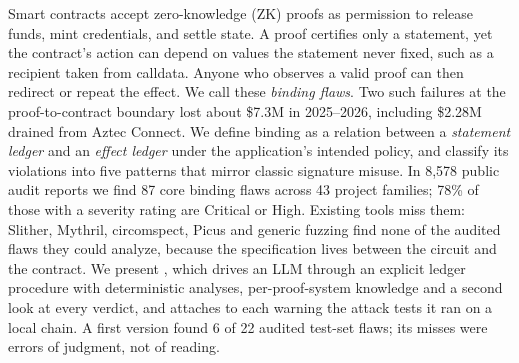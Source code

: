 Smart contracts accept zero-knowledge (ZK) proofs as permission to release
funds, mint credentials, and settle state. A proof certifies only a
statement, yet the contract's action can depend on values the statement never
fixed, such as a recipient taken from calldata. Anyone who observes a valid
proof can then redirect or repeat the effect. We call these \emph{binding
flaws}. Two such failures at the proof-to-contract boundary lost about
\$7.3M in 2025--2026, including \$2.28M drained from Aztec Connect. We define
binding as a relation between a \emph{statement ledger} and an \emph{effect
ledger} under the application's intended policy, and classify its violations
into five patterns that mirror classic signature misuse. In 8,578 public
audit reports we find 87 core binding flaws across 43 project families; 78\%
of those with a severity rating are Critical or High. Existing tools miss
them: Slither, Mythril, circomspect, Picus and generic fuzzing find none of
the audited flaws they could analyze, because the specification lives between
the circuit and the contract. We present \tool{}, which drives an LLM through
an explicit ledger procedure with deterministic analyses, per-proof-system
knowledge and a second look at every verdict, and attaches to each warning
the attack tests it ran on a local chain. A first version found 6 of 22
audited test-set flaws; its misses were errors of judgment, not of reading.
